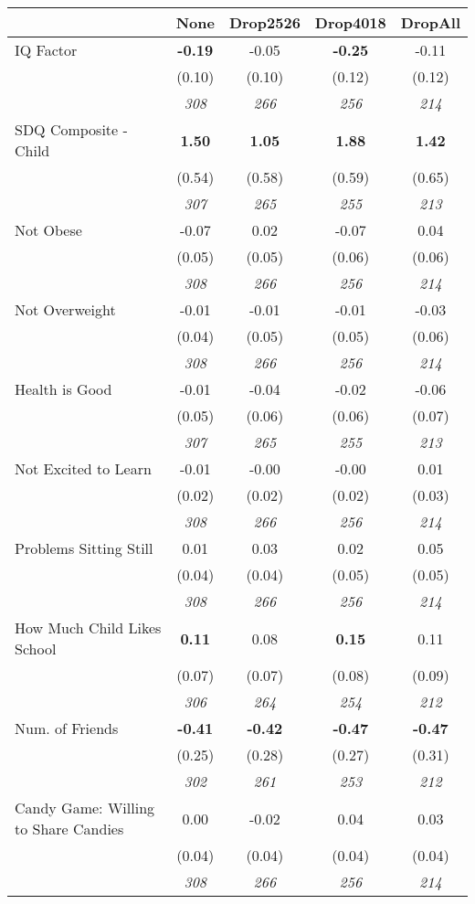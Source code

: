 \begin{tabular}{l c c c c}
\toprule
 & None & Drop2526 & Drop4018 & DropAll \\
\midrule
IQ Factor & \textbf{ -0.19 } & -0.05 & \textbf{ -0.25 } & -0.11 \\
& (0.10) & (0.10) & (0.12) & (0.12) \\
& \textit{ 308 } & \textit{ 266 } & \textit{ 256 } & \textit{ 214 } \\
SDQ Composite - Child & \textbf{ 1.50 } & \textbf{ 1.05 } & \textbf{ 1.88 } & \textbf{ 1.42 } \\
& (0.54) & (0.58) & (0.59) & (0.65) \\
& \textit{ 307 } & \textit{ 265 } & \textit{ 255 } & \textit{ 213 } \\
Not Obese & -0.07 & 0.02 & -0.07 & 0.04 \\
& (0.05) & (0.05) & (0.06) & (0.06) \\
& \textit{ 308 } & \textit{ 266 } & \textit{ 256 } & \textit{ 214 } \\
Not Overweight & -0.01 & -0.01 & -0.01 & -0.03 \\
& (0.04) & (0.05) & (0.05) & (0.06) \\
& \textit{ 308 } & \textit{ 266 } & \textit{ 256 } & \textit{ 214 } \\
Health is Good & -0.01 & -0.04 & -0.02 & -0.06 \\
& (0.05) & (0.06) & (0.06) & (0.07) \\
& \textit{ 307 } & \textit{ 265 } & \textit{ 255 } & \textit{ 213 } \\
Not Excited to Learn & -0.01 & -0.00 & -0.00 & 0.01 \\
& (0.02) & (0.02) & (0.02) & (0.03) \\
& \textit{ 308 } & \textit{ 266 } & \textit{ 256 } & \textit{ 214 } \\
Problems Sitting Still & 0.01 & 0.03 & 0.02 & 0.05 \\
& (0.04) & (0.04) & (0.05) & (0.05) \\
& \textit{ 308 } & \textit{ 266 } & \textit{ 256 } & \textit{ 214 } \\
How Much Child Likes School & \textbf{ 0.11 } & 0.08 & \textbf{ 0.15 } & 0.11 \\
& (0.07) & (0.07) & (0.08) & (0.09) \\
& \textit{ 306 } & \textit{ 264 } & \textit{ 254 } & \textit{ 212 } \\
Num. of Friends & \textbf{ -0.41 } & \textbf{ -0.42 } & \textbf{ -0.47 } & \textbf{ -0.47 } \\
& (0.25) & (0.28) & (0.27) & (0.31) \\
& \textit{ 302 } & \textit{ 261 } & \textit{ 253 } & \textit{ 212 } \\
Candy Game: Willing to Share Candies & 0.00 & -0.02 & 0.04 & 0.03 \\
& (0.04) & (0.04) & (0.04) & (0.04) \\
& \textit{ 308 } & \textit{ 266 } & \textit{ 256 } & \textit{ 214 } \\
\bottomrule
\end{tabular}

